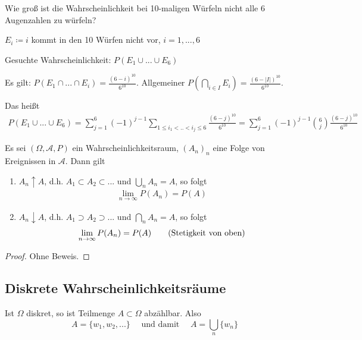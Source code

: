 \documentclass[a4paper, landscape,twocolumn,fontsize=9pt]{scrartcl}
\begin{document}
\begin{example}{}{}
Wie groß ist die Wahrscheinlichkeit bei 10-maligen Würfeln nicht alle 6 Augenzahlen zu würfeln?
\end{example}

$E_i \coloneqq i$ kommt in den 10 Würfen nicht vor, $i = 1,..., 6$

Gesuchte Wahrscheinlichkeit: $P(E_1 \cup ... \cup E_6)$

Es gilt: $P(E_1 \cap ... \cap E_i) = \frac{(6-i)^{10}}{6^{10}}$. Allgemeiner $P(\bigcap_{i \in I} E_i) = \frac{(6- |I|)^{10}}{6^{10}}$.

Das heißt
\begin{align*}
	P(E_1 \cup ... \cup E_6) = \sum^6_{j=1} (-1)^{j-1} \sum_{1 \leq i_1 < .. < i_j \leq 6} \frac{(6-j)^{10}}{6^{10}} = \sum^6_{j=1} (-1)^{j-1} \binom{6}{j} \frac{(6-j)^{10}}{6^{10}}
\end{align*}

\begin{theorem}{}{}
Es sei $(\Omega, \mathcal A, P)$ ein Wahrscheinlichkeitsraum, $(A_n)_n$ eine Folge von Ereignissen in $\mathcal A$. Dann gilt
\begin{enumerate}
\item $A_n \uparrow A$, d.h. $A_1 \subset A_2 \subset ... $ und $\bigcup_n A_n = A$, so folgt
\begin{align*}
	\lim_{n \to \infty}P(A_n) = P(A) \tag{Stetigkeit von unten}
\end{align*}

\item $A_n \downarrow A$, d.h. $A_1 \supset A_2 \supset ...$ und $\bigcap_n A_n = A$, so folgt
\begin{align*}
	\lim_{n \to \infty} P(A_n) = P(A) \tag{\text{Stetigkeit von oben}}
\end{align*}
\end{enumerate}
\end{theorem}

\begin{proof}
Ohne Beweis.
\end{proof}


\subsection{Diskrete Wahrscheinlichkeitsräume}
Ist $\Omega$ diskret, so ist Teilmenge $A \subset \Omega$ abzählbar. Also
\[
	A = \{ w_1, w_2, ... \} \quad \text{ und damit } \quad A = \bigcup_{n} \{ w_n \}
\]
\end{document}
